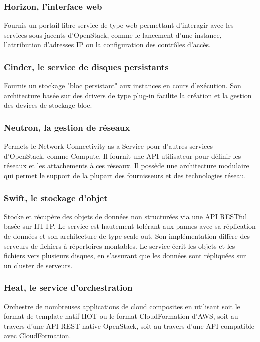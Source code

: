 \documentclass[]{article}
\begin{document}
\subsubsection{Horizon, l'interface web}\label{horizon-linterface-web}
Fournis un portail libre-service de type web permettant d'interagir avec
les services sous-jacents d'OpenStack, comme le lancement d'une
instance, l'attribution d'adresses IP ou la configuration des contrôles
d'accès.
\subsubsection{Cinder, le service de disques
persistants}\label{cinder-le-service-de-disques-persistants}
Fournis un stockage "bloc persistant" aux instances en cours d'exécution.
Son architecture basée sur des drivers de type plug-in facilite la
création et la gestion des devices de stockage bloc.

\subsubsection{Neutron, la gestion de
réseaux}\label{neutron-la-gestion-de-ruxe9seaux}
Permets le Network-Connectivity-as-a-Service pour d'autres services
d'OpenStack, comme Compute. Il fournit une API utilisateur pour définir
les réseaux et les attachements à ces réseaux. Il possède une
architecture modulaire qui permet le support de la plupart des
fournisseurs et des technologies réseau.

\subsubsection{Swift, le stockage
d'objet}\label{swift-le-stockage-dobjet}
Stocke et récupère des objets de données non structurées via une API
RESTful basée sur HTTP. Le service est hautement tolérant aux pannes
avec sa réplication de données et son architecture de type scale-out.
Son implémentation diffère des serveurs de fichiers à répertoires
montables. Le service écrit les objets et les fichiers vers plusieurs
disques, en s'assurant que les données sont répliquées sur un cluster de
serveurs.

\subsubsection{Heat, le service
d'orchestration}\label{heat-le-service-dorchestration}
Orchestre de nombreuses applications de cloud composites en utilisant
soit le format de template natif HOT ou le format CloudFormation d'AWS,
soit au travers d'une API REST native OpenStack, soit au travers d'une
API compatible avec CloudFormation.
\end{document}
